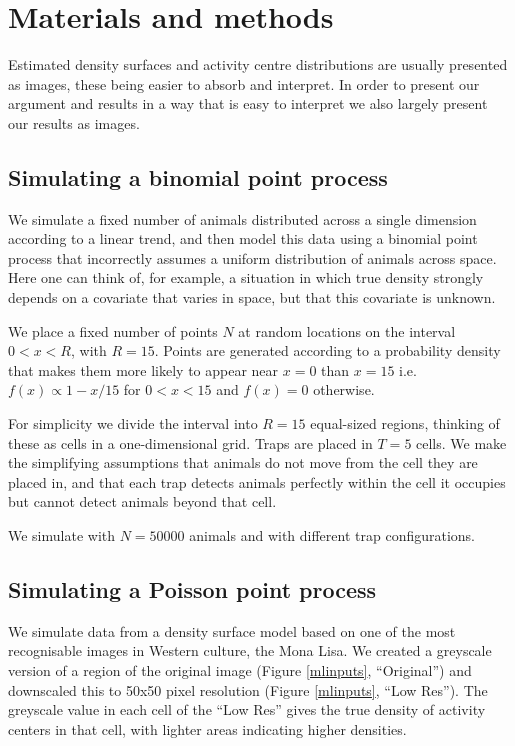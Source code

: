 \documentclass[a4paper,12pt]{article}
\begin{document}
\section{Materials and methods}

Estimated density surfaces and activity centre distributions are usually presented as images, these being easier to absorb and interpret. In order to present our argument and results in a way that is easy to interpret we also largely present our results as images.

\subsection{Simulating a binomial point process}
We simulate a fixed number of animals distributed across a single dimension according to a linear trend, and then model this data using a binomial point process that incorrectly assumes a uniform distribution of animals across space. Here one can think of, for example, a situation in which true density strongly depends on a covariate that varies in space, but that this covariate is unknown. 

We place a fixed number of points $N$ at random locations on the interval $0<x<R$, with $R=15$. Points are generated according to a probability density that makes them more likely to appear near $x=0$ than $x=15$ i.e.\ $f(x)\propto 1-x/15$ for $0<x<15$ and $f(x)=0$ otherwise.

For simplicity we divide the interval into $R=15$ equal-sized regions, thinking of these as cells in a one-dimensional grid. Traps are placed in $T=5$ cells. We make the simplifying assumptions that animals do not move from the cell they are placed in, and that each trap detects animals perfectly within the cell it occupies but cannot detect animals beyond that cell. 

We simulate with $N=50000$ animals and with different trap configurations.

\subsection{Simulating a Poisson point process}
We simulate data from a density surface model based on one of the most recognisable images in Western culture, the Mona Lisa. We created a greyscale version of a region of the original image (Figure \ref{mlinputs}, ``Original'') and downscaled this to 50x50 pixel resolution (Figure \ref{mlinputs}, ``Low Res''). The greyscale value in each cell of the ``Low Res'' gives the true density of activity centers in that cell, with lighter areas indicating higher densities. 
\end{document}
